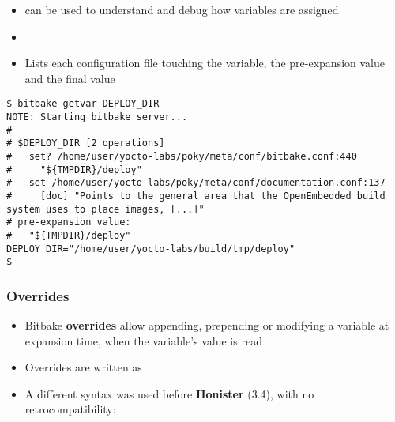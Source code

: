\begin{frame}[fragile]
  \frametitle{}
  \begin{itemize}
    \item {} can be used to understand and debug
      how variables are assigned
    \item {}
    \item Lists each configuration file touching the variable, the
      pre-expansion value and the final value
  \end{itemize}
  \begin{block}{}
    \begin{verbatim}
$ bitbake-getvar DEPLOY_DIR
NOTE: Starting bitbake server...
#
# $DEPLOY_DIR [2 operations]
#   set? /home/user/yocto-labs/poky/meta/conf/bitbake.conf:440
#     "${TMPDIR}/deploy"
#   set /home/user/yocto-labs/poky/meta/conf/documentation.conf:137
#     [doc] "Points to the general area that the OpenEmbedded build system uses to place images, [...]"
# pre-expansion value:
#   "${TMPDIR}/deploy"
DEPLOY_DIR="/home/user/yocto-labs/build/tmp/deploy"
$
    \end{verbatim}
  \end{block}
\end{frame}

\begin{frame}
  \frametitle{Overrides}
  \begin{itemize}
  \item Bitbake \textbf{overrides} allow appending, prepending or modifying
    a variable at expansion time, when the variable's value is read
  \item Overrides are written as 
  \item A different syntax was used before \textbf{Honister} (3.4), with no
    retrocompatibility: 
  \end{itemize}
\end{frame}

